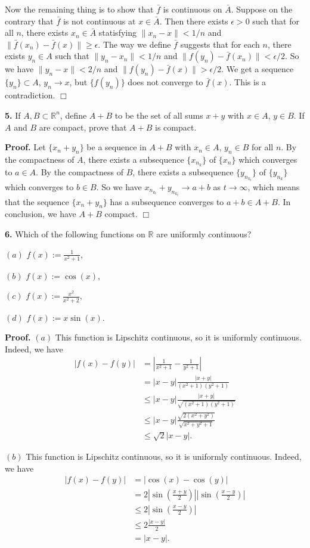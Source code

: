 \documentclass{article}
\begin{document}
Now the remaining thing is to show that $\bar{f}$ is continuous on
$\bar{A}$. Suppose on the contrary that $\bar{f}$ is not continuous at
$x\in \bar{A}$. Then there exists $\epsilon > 0$ such that for all $n$,
there exists $x_n\in\bar{A}$ statisfying $\|x_n-x\| < 1/n$ and
$\|\bar{f}(x_n) - \bar{f}(x)\| \ge \epsilon$. The way we define
$\bar{f}$ suggests that for each $n$, there exists $y_n\in A$ such that
$\|y_n - x_n\| < 1/n$ and $\|f(y_n) - \bar{f}(x_n)\| < \epsilon/2$. So
we have $\|y_n - x\| < 2/n$ and $\|f(y_n)-\bar{f}(x)\| > \epsilon/2$. We
get a sequence $\{y_n\}\subset A$, $y_n \to x$, but $\{f(y_n)\}$ does
not converge to $\bar{f}(x)$. This is a contradiction. $\Box$

    \textbf{5.} If $A,B\subset \mathbb{R}^n$, define $A+B$ to be the set of
all sums $x+y$ with $x\in A$, $y\in B$. If $A$ and $B$ are compact,
prove that $A + B$ is compact.

\textbf{Proof.} Let $\{x_n+y_n\}$ be a sequence in $A+B$ with
$x_n \in A$, $y_n \in B$ for all $n$. By the compactness of $A$, there
exists a subsequence $\{x_{n_k}\}$ of $\{x_n\}$ which converges to
$a \in A$. By the compactness of $B$, there exists a subsequence
$\{y_{n_{k_t}}\}$ of $\{y_{n_k}\}$ which converges to $b\in B$. So we
have $x_{n_{k_t}}+ y_{n_{k_t}} \to a + b$ as $t\to \infty$, which means
that the sequence $\{x_n+y_n\}$ has a subsequence converges to
$a+b \in A +B$. In conclusion, we have $A+B$ compact. $\Box$

    \textbf{6.} Which of the following functions on $\mathbb{R}$ are
uniformly continuous?

$(a)$ $f(x) := \frac{1}{x^2 +1}$,

$(b)$ $f(x) := \cos(x)$,

$(c)$ $f(x) := \frac{x^2}{x^2+2}$,

$(d)$ $f(x) := x\sin(x)$.

\textbf{Proof.} $(a)$ This function is Lipschitz continuous, so it is
uniformly continuous. Indeed, we have \[\begin{aligned}
|f(x) - f(y)| &= \left|\frac{1}{x^2+1}- \frac{1}{y^2+1}\right| \\
& = |x-y|\frac{|x+y|}{(x^2+1)(y^2+1)} \\
&\le |x-y| \frac{|x+y|}{\sqrt{(x^2+1)(y^2+1)}} \\
&\le |x-y| \frac{\sqrt{2(x^2+y^2)}}{\sqrt{x^2 + y^2+1}} \\
& \le \sqrt{2}|x-y|.
\end{aligned}
\]

$(b)$ This function is Lipschitz continuous, so it is uniformly
continuous. Indeed, we have \[\begin{aligned}
|f(x) - f(y)| &= |\cos(x) - \cos(y)|\\
&= 2\left|\sin\left(\frac{x+y}{2}\right)\right|\left|\sin\left(\frac{x-y}{2}\right)\right| \\
&\le 2\left|\sin\left(\frac{x-y}{2}\right)\right| \\
&\le 2\frac{|x-y|}{2}\\
&= |x-y|.
\end{aligned}
\]
\end{document}

